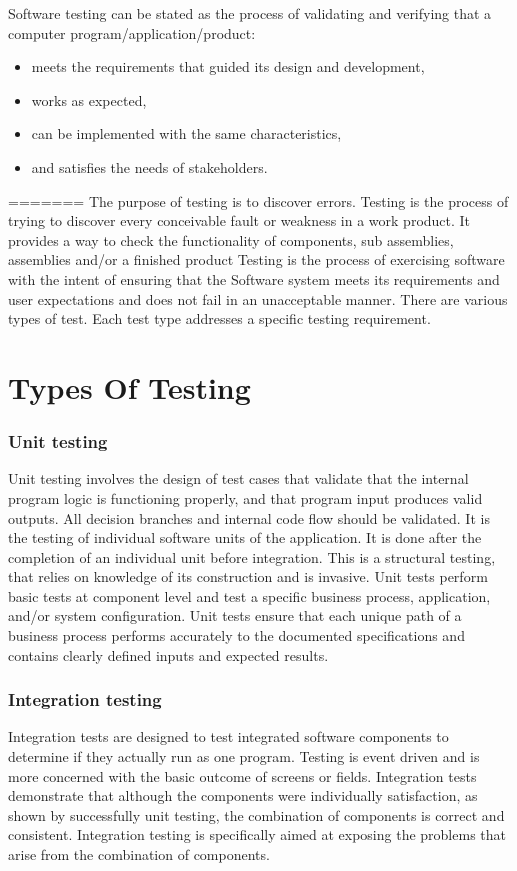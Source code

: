 \documentclass[12pt]{report}
\begin{document}
Software testing can be stated as the process of validating and verifying that a computer program/application/product:


\begin{itemize}
\item meets the requirements that guided its design and development,
\item works as expected,
\item can be implemented with the same characteristics,
\item and satisfies the needs of stakeholders.

\end{itemize}
=======
The purpose of testing is to discover errors. Testing is the process of trying to
discover every conceivable fault or weakness in a work product. It provides a way to
check the functionality of components, sub assemblies, assemblies and/or a finished
product Testing is the process of exercising software with the intent of ensuring that
the Software system meets its requirements and user expectations and does not fail in
an unacceptable manner. There are various types of test. Each test type addresses a
specific testing requirement.
\section{Types Of Testing}
\subsubsection{Unit testing}
Unit testing involves the design of test cases that validate that the internal
program logic is functioning properly, and that program input produces valid outputs.
All decision branches and internal code flow should be validated. It is the testing of
individual software units of the application. It is done after the completion of an
individual unit before integration. This is a structural testing, that relies on knowledge
of its construction and is invasive. Unit tests perform basic tests at component level
and test a specific business process, application, and/or system configuration. Unit
tests ensure that each unique path of a business process performs accurately to the
documented specifications and contains clearly defined inputs and expected results.
\subsubsection{Integration testing}
Integration tests are designed to test integrated software components to
determine if they actually run as one program. Testing is event driven and is more
concerned with the basic outcome of screens or fields. Integration tests demonstrate
that although the components were individually satisfaction, as shown by successfully
unit testing, the combination of components is correct and consistent. Integration
testing is specifically aimed at exposing the problems that arise from the combination
of components.
\end{document}
